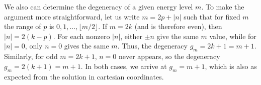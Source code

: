 {We also can determine the degeneracy of a given energy level $m$.
To make the argument more straightforward, let us write $m = 2p + |n|$ such that for fixed $m$ the range of $p$ is $0,1,\ldots,\lfloor m/2 \rfloor$.
If $m = 2k$ (and is therefore even), then $|n| = 2(k - p)$.
For each nonzero $|n|$, either $\pm n$ give the same $m$ value, while for $|n| = 0$, only $n = 0$ gives the same $m$.
Thus, the degeneracy $g_{m} = 2k + 1 = m + 1$.
Similarly, for odd $m = 2k + 1$, $n = 0$ never appears, so the degeneracy $g_{m} = 2(k+1) = m + 1$.
In both cases, we arrive at $g_{m} = m + 1$, which is also as expected from the solution in cartesian coordinates.


}





